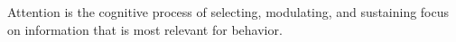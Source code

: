 \documentclass[a4paper]{article}
\title{}
\date{}
\author{Mohammad Rahmani}
\begin{document}
   \maketitle

   \cite{chun-2011-a-taxonomy-of-external-and-internal-attention}
   Attention is the cognitive process of selecting, modulating, and sustaining focus on information that is most relevant for behavior.

   
   
\end{document}
